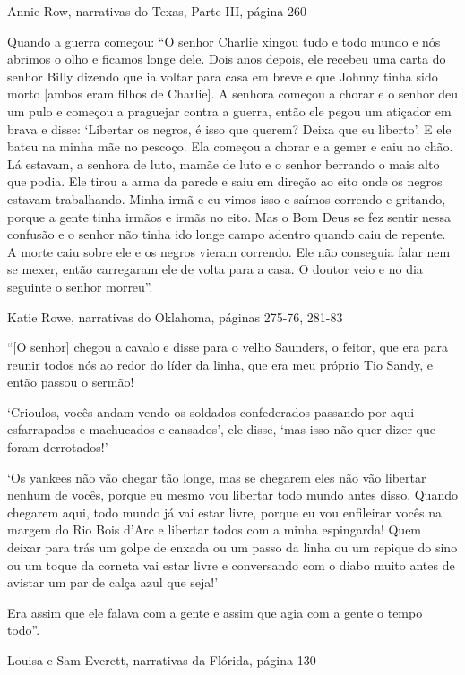 Annie Row, narrativas do Texas, Parte III, página 260

Quando a guerra começou: ``O senhor Charlie xingou tudo e todo mundo e
nós abrimos o olho e ficamos longe dele. Dois anos depois, ele recebeu
uma carta do senhor Billy dizendo que ia voltar para casa em breve e que
Johnny tinha sido morto {[}ambos eram filhos de Charlie{]}. A senhora
começou a chorar e o senhor deu um pulo e começou a praguejar contra a
guerra, então ele pegou um atiçador em brava e disse: `Libertar os
negros, é isso que querem? Deixa que eu liberto'. E ele bateu na minha
mãe no pescoço. Ela começou a chorar e a gemer e caiu no chão. Lá
estavam, a senhora de luto, mamãe de luto e o senhor berrando o mais
alto que podia. Ele tirou a arma da parede e saiu em direção ao eito
onde os negros estavam trabalhando. Minha irmã e eu vimos isso e saímos
correndo e gritando, porque a gente tinha irmãos e irmãs no eito. Mas o
Bom Deus se fez sentir nessa confusão e o senhor não tinha ido longe
campo adentro quando caiu de repente. A morte caiu sobre ele e os negros
vieram correndo. Ele não conseguia falar nem se mexer, então carregaram
ele de volta para a casa. O doutor veio e no dia seguinte o senhor
morreu''.

Katie Rowe, narrativas do Oklahoma, páginas 275-76, 281-83

``{[}O senhor{]} chegou a cavalo e disse para o velho Saunders, o
feitor, que era para reunir todos nós ao redor do líder da linha, que
era meu próprio Tio Sandy, e então passou o sermão!

`Crioulos, vocês andam vendo os soldados confederados passando por aqui
esfarrapados e machucados e cansados', ele disse, `mas isso não quer
dizer que foram derrotados!'

`Os yankees não vão chegar tão longe, mas se chegarem eles não vão
libertar nenhum de vocês, porque eu mesmo vou libertar todo mundo antes
disso. Quando chegarem aqui, todo mundo já vai estar livre, porque eu
vou enfileirar vocês na margem do Rio Bois d'Arc e libertar todos com a
minha espingarda! Quem deixar para trás um golpe de enxada ou um passo
da linha ou um repique do sino ou um toque da corneta vai estar livre e
conversando com o diabo muito antes de avistar um par de calça azul que
seja!'

Era assim que ele falava com a gente e assim que agia com a gente o
tempo todo''.

Louisa e Sam Everett, narrativas da Flórida, página 130

